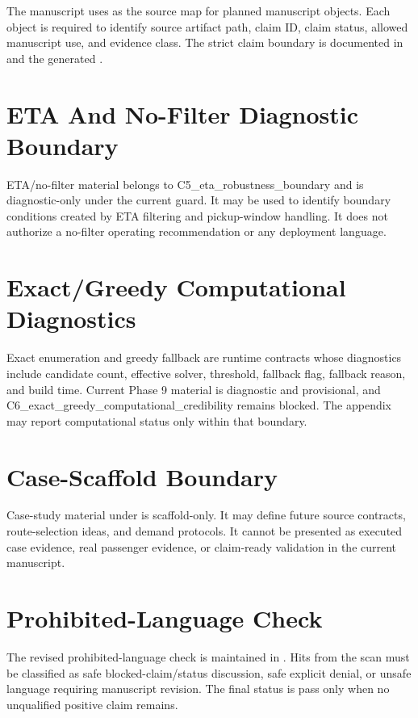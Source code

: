 \documentclass[a4paper,fleqn,review]{cas-dc}
\newcommand{\code}[1]{\texttt{\detokenize{#1}}}
\begin{document}
The manuscript uses
 as the source map for
planned manuscript objects. Each object is required to identify source
artifact path, claim ID, claim status, allowed manuscript use, and evidence
class. The strict claim boundary is documented in
 and the generated
.

\section{ETA And No-Filter Diagnostic Boundary}

ETA/no-filter material belongs to C5\_eta\_robustness\_boundary and is
diagnostic-only under the current guard. It may be used to identify boundary
conditions created by ETA filtering and pickup-window handling. It does not
authorize a no-filter operating recommendation or any deployment language.

\section{Exact/Greedy Computational Diagnostics}

Exact enumeration and greedy fallback are runtime contracts whose diagnostics
include candidate count, effective solver, threshold, fallback flag, fallback
reason, and build time. Current Phase 9 material is diagnostic and
provisional, and C6\_exact\_greedy\_computational\_credibility remains
blocked. The appendix may report computational status only within that
boundary.

\section{Case-Scaffold Boundary}

Case-study material under \code{.planning/data/case_studies/} is
scaffold-only. It may define future source contracts, route-selection ideas,
and demand protocols. It cannot be presented as executed case evidence, real
passenger evidence, or claim-ready validation in the current manuscript.

\section{Prohibited-Language Check}

The revised prohibited-language check is maintained in
. Hits from
the scan must be classified as safe blocked-claim/status discussion, safe
explicit denial, or unsafe language requiring manuscript revision. The final
status is pass only when no unqualified positive claim remains.



\end{document}
